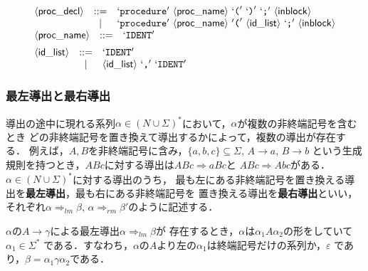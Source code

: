 \documentclass[a4j,dvipdfmx]{jbook}
\begin{document}
\[\begin{array}{l}
    \begin{array}{rcl}
      \tuple{\mathsf{proc\_decl}} & \mathtt{::=} & `\texttt{procedure}'\ \tuple{\mathsf{proc\_name}}\ `\texttt{(}'\ `\texttt{)}'\ `\texttt{;}'\ \tuple{\mathsf{inblock}}              \\
                                  & |            & `\texttt{procedure}'\ \tuple{\mathsf{proc\_name}}\ '\texttt{(}'\ \tuple{\mathsf{id\_list}}\ `\texttt{;}'\ \tuple{\mathsf{inblock}} \\
    \end{array} \\[5pt]
    \begin{array}{rcl}
      \tuple{\mathsf{proc\_name}} & \mathtt{::=} & `\texttt{IDENT}'
    \end{array}                                                                                                                              \\[5pt]
    \begin{array}{rcl}
      \tuple{\mathsf{id\_list}} & \mathtt{::=} & `\texttt{IDENT}'                                          \\
                                & |            & \tuple{\mathsf{id\_list}}\ `\texttt{,}'\ `\texttt{IDENT}'
    \end{array}
  \end{array}\]

\subsubsection{最左導出と最右導出}

導出の途中に現れる系列$\alpha\in(N\cup\Sigma)^\ast$において，$\alpha$が複数の非終端記号を含むとき
どの非終端記号を置き換えて導出するかによって，複数の導出が存在する．
例えば，$A,B$を非終端記号に含み，$\{a,b,c\}\subseteq\Sigma$, $A\rightarrow a$, $B\rightarrow b$
という生成規則を持つとき，$ABc$に対する導出は$ABc\Rightarrow aBc$と
$ABc\Rightarrow Abc$がある．$\alpha\in(N\cup\Sigma)^\ast$に対する導出のうち，
最も左にある非終端記号を置き換える導出を{\bf 最左導出}，最も右にある非終端記号を
置き換える導出を{\bf 最右導出}といい，それぞれ$\alpha\Rightarrow_{lm}\beta$,
$\alpha\Rightarrow_{rm}\beta'$のように記述する．

$\alpha$の$A\rightarrow\gamma$による最左導出$\alpha\Rightarrow_{lm}\beta$が
存在するとき，$\alpha$は$\alpha_1 A\alpha_2$の形をしていて$\alpha_1\in\Sigma^\ast$
である．すなわち，$\alpha$の$A$より左の$\alpha_1$は終端記号だけの系列か，$\varepsilon$
であり，$\beta=\alpha_1\gamma\alpha_2$である．
\end{document}
